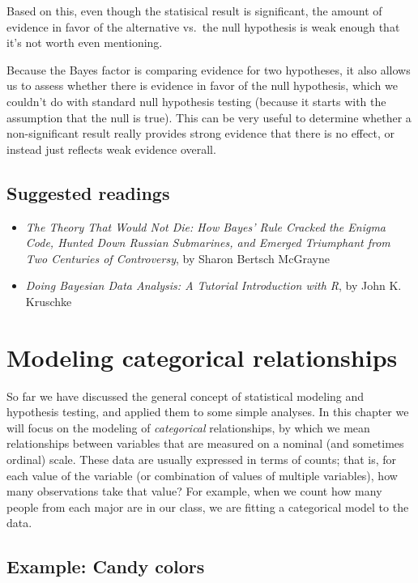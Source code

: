 \documentclass[]{book}
\providecommand{\tightlist}{%
  \setlength{\itemsep}{0pt}\setlength{\parskip}{0pt}}
\theoremstyle{definition}
\theoremstyle{definition}
\theoremstyle{definition}
\theoremstyle{remark}
\begin{document}
Based on this, even though the statisical result is significant, the
amount of evidence in favor of the alternative vs.~the null hypothesis
is weak enough that it's not worth even mentioning.

Because the Bayes factor is comparing evidence for two hypotheses, it
also allows us to assess whether there is evidence in favor of the null
hypothesis, which we couldn't do with standard null hypothesis testing
(because it starts with the assumption that the null is true). This can
be very useful to determine whether a non-significant result really
provides strong evidence that there is no effect, or instead just
reflects weak evidence overall.

\section{Suggested readings}\label{suggested-readings-8}

\begin{itemize}
\tightlist
\item
  \emph{The Theory That Would Not Die: How Bayes' Rule Cracked the
  Enigma Code, Hunted Down Russian Submarines, and Emerged Triumphant
  from Two Centuries of Controversy}, by Sharon Bertsch McGrayne
\item
  \emph{Doing Bayesian Data Analysis: A Tutorial Introduction with R},
  by John K. Kruschke
\end{itemize}

\chapter{Modeling categorical
relationships}\label{modeling-categorical-relationships}

So far we have discussed the general concept of statistical modeling and
hypothesis testing, and applied them to some simple analyses. In this
chapter we will focus on the modeling of \emph{categorical}
relationships, by which we mean relationships between variables that are
measured on a nominal (and sometimes ordinal) scale. These data are
usually expressed in terms of counts; that is, for each value of the
variable (or combination of values of multiple variables), how many
observations take that value? For example, when we count how many people
from each major are in our class, we are fitting a categorical model to
the data.

\section{Example: Candy colors}\label{example-candy-colors}
\end{document}
